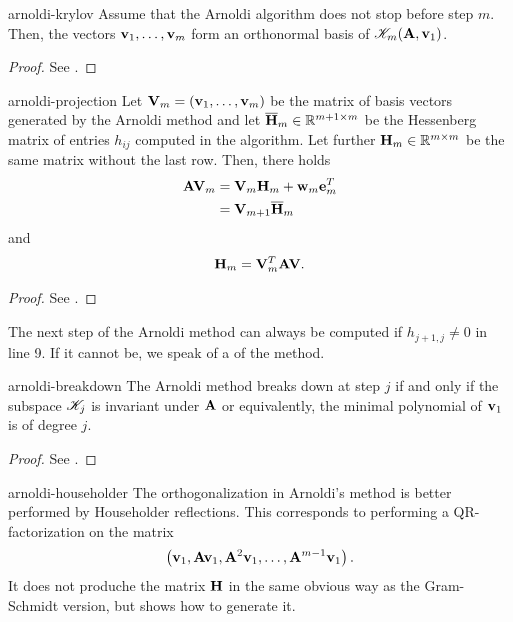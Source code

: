 \begin{Lemma}{arnoldi-krylov}
  Assume that the Arnoldi algorithm does not stop before step
  $m$. Then, the vectors $\mathbf v_1,\dots,\mathbf v_m$ form an orthonormal basis
  of $\mathscr K_m(\mathbf A,\mathbf v_1)$.
\end{Lemma}

\begin{proof}
  See \cite[Proposition 6.4]{Saad00}.
\end{proof}

\begin{Theorem}{arnoldi-projection}
  Let $\mathbf V_m = (\mathbf v_1,\dots,\mathbf v_m)$ be the matrix of basis vectors
  generated by the Arnoldi method and let
  $\overline{\mathbf H}_m\in\mathbb R^{m+1\times m}$ be the Hessenberg matrix of
  entries $h_{ij}$ computed in the algorithm. Let further
  $\mathbf H_m\in\mathbb R^{m\times m}$ be the same matrix without the last
  row. Then, there holds
  \begin{align}
    \mathbf A\mathbf V_m &= \mathbf V_m\mathbf H_m+\mathbf w_m\mathbf e_m^T\\
                 &= \mathbf V_{m+1}\overline{\mathbf H}_m\\
  \end{align}
  and
  \begin{gather}
    \mathbf H_m = \mathbf V_m^T\mathbf A\mathbf V.
  \end{gather}
\end{Theorem}

\begin{proof}
  See \cite[Proposition 6.5]{Saad00}.
\end{proof}

\begin{remark}
  The next step of the Arnoldi method can always be computed if
  $h_{j+1,j}\neq 0$ in line 9. If it cannot be, we speak of a
   of the method.
\end{remark}

\begin{Lemma}{arnoldi-breakdown}
  The Arnoldi method breaks down at step $j$ if and only if the subspace $\mathscr K_j$ is invariant under $\mathbf A$ or equivalently, the minimal polynomial of $\mathbf v_1$ is of degree $j$.
\end{Lemma}

\begin{proof}
  See \cite[Proposition 6.6]{Saad00}.
\end{proof}

\begin{Remark}{arnoldi-householder}
  The orthogonalization in Arnoldi's method is better performed by
  Householder reflections. This corresponds to performing a
  QR-factorization on the matrix
  \begin{gather}
    \left(\mathbf v_1,\mathbf A\mathbf v_1, \mathbf A^2\mathbf v_1,\dots,\mathbf A^{m-1}\mathbf v_1\right).
  \end{gather}
  It does not produche the matrix $\mathbf H$ in the same obvious way as
  the Gram-Schmidt version, but \cite[Algorithm 6.3]{Saad00} shows how
  to generate it.
\end{Remark}

